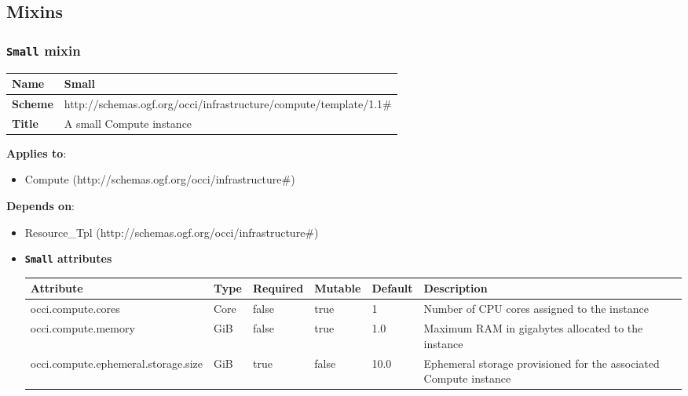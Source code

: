 \subsection{Mixins}
\subsubsection{\texttt{Small} mixin}
\begin{center}
\begin{tabular}{|l|l|}
  \hline
  \textbf{Name} & Small \\
  \hline  
  \textbf{Scheme} & http://schemas.ogf.org/occi/infrastructure/compute/template/1.1\# \\
  \hline
  \textbf{Title} & A small Compute instance \\
  \hline
\end{tabular}
\end{center}
\textbf{Applies to}:
\begin{itemize}
	\item Compute (http://schemas.ogf.org/occi/infrastructure\#)
\end{itemize}
\textbf{Depends on}:
\begin{itemize}
	\item Resource\_Tpl (http://schemas.ogf.org/occi/infrastructure\#)
\end{itemize}

\begin{itemize}
\item \textbf{\texttt{Small} attributes}

\begin{tabularx}{\textwidth}{|l|l|p{1.4cm}|p{1.3cm}|l|X|}
  \hline
  \textbf{Attribute} & \textbf{Type} & \textbf{Required} & \textbf{Mutable} & \textbf{Default} & \textbf{Description} \\
  \hline  
  occi.compute.cores & Core & false & true & 1 & Number of CPU cores assigned to the instance \\
  \hline
  occi.compute.memory & GiB & false & true & 1.0 & Maximum RAM in gigabytes allocated to the instance \\
  \hline
  occi.compute.ephemeral.storage.size & GiB & true & false & 10.0 & Ephemeral storage provisioned for the associated Compute instance \\
  \hline
\end{tabularx}
\end{itemize}


